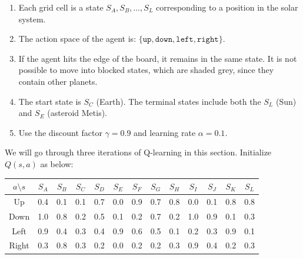\documentclass[11pt,addpoints,answers]{exam}
\newcommand{\sall}{\textbf{Select all that apply: }}
\begin{document}
\begin{questions}
\begin{enumerate}
    \item Each grid cell is a state $S_A, S_B, \hdots , S_L$ corresponding to a position in the solar system.
    \item The action space of the agent is: $\{\texttt{up}, \texttt{down}, \texttt{left}, \texttt{right}\}$.
    \item If the agent hits the edge of the board, it remains in the same state. It is not possible to move into blocked states, which are shaded grey, since they contain other planets.
    \item The start state is $S_C$ (Earth). The terminal states include both the $S_L$ (Sun) and $S_E$ (asteroid Metis).
    \item Use the discount factor $\gamma = 0.9$ and learning rate $\alpha=0.1$.
\end{enumerate}

We will go through three iterations of Q-learning in this section. Initialize $Q(s,a)$ as below:

\begin{table}[h!]
\centering
 \begin{tabular}{||c c c c c c c c c c c c c||} 
 \hline
 $a \setminus s$ & $S_A$ & $S_B$ & $S_C$ & $S_D$ & $S_E$ & $S_F$ & $S_G$ & $S_H$ & $S_I$ & $S_J$ & $S_K$ & $S_L$ \\ [0.4ex] 
 \hline\hline
 Up    & 0.4 & 0.1 & 0.1 & 0.7 & 0.0 & 0.9 & 0.7 & 0.8 & 0.0 & 0.1 & 0.8 & 0.8 \\ 
 Down  & 1.0 & 0.8 & 0.2 & 0.5 & 0.1 & 0.2 & 0.7 & 0.2 & 1.0 & 0.9 & 0.1 & 0.3 \\ 
 Left  & 0.9 & 0.4 & 0.3 & 0.4 & 0.9 & 0.6 & 0.5 & 0.1 & 0.2 & 0.3 & 0.9 & 0.1 \\
 Right & 0.3 & 0.8 & 0.3 & 0.2 & 0.0 & 0.2 & 0.2 & 0.3 & 0.9 & 0.4 & 0.2 & 0.3 \\  [1ex] 
 \hline
 \end{tabular}
\end{table}

\end{questions}
\end{document}
